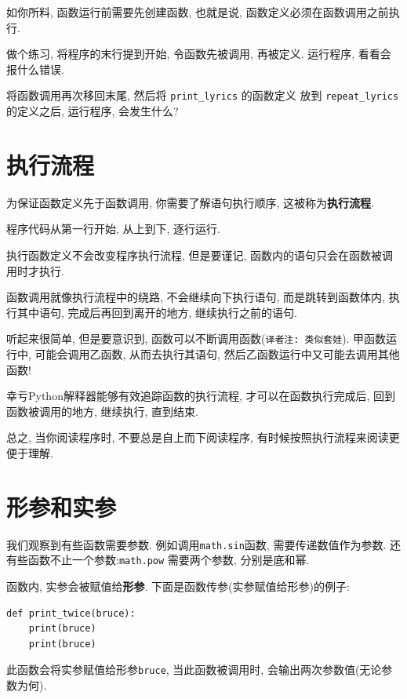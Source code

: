 \documentclass[10pt]{book}
\begin{document}
如你所料, 函数运行前需要先创建函数, 也就是说, 
函数定义必须在函数调用之前执行. 

做个练习, 将程序的末行提到开始, 令函数先被调用, 再被定义. 
运行程序, 看看会报什么错误. 

将函数调用再次移回末尾, 然后将 \verb"print_lyrics" 的函数定义
放到 \verb"repeat_lyrics" 的定义之后, 运行程序, 会发生什么?

\section{执行流程}

为保证函数定义先于函数调用, 你需要了解语句执行顺序, 
这被称为{\bf 执行流程}. 

程序代码从第一行开始, 从上到下, 逐行运行. 

执行函数定义不会改变程序执行流程, 
但是要谨记, 函数内的语句只会在函数被调用时才执行. 

函数调用就像执行流程中的绕路, 不会继续向下执行语句, 
而是跳转到函数体内, 执行其中语句, 完成后再回到离开的地方, 
继续执行之前的语句. 

听起来很简单, 但是要意识到, 函数可以不断调用函数({\tt 译者注: 类似套娃}).
甲函数运行中, 可能会调用乙函数, 从而去执行其语句, 
然后乙函数运行中又可能去调用其他函数!

幸亏Python解释器能够有效追踪函数的执行流程, 才可以在函数执行完成后, 
回到函数被调用的地方, 继续执行, 直到结束. 

总之, 当你阅读程序时, 不要总是自上而下阅读程序, 
有时候按照执行流程来阅读更便于理解. 


\section{形参和实参}
\label{parameters}

我们观察到有些函数需要参数. 例如调用{\tt math.sin}函数, 需要传递数值作为参数. 
还有些函数不止一个参数:{\tt math.pow} 需要两个参数, 分别是底和幂. 

函数内, 实参会被赋值给{\bf 形参}. 
下面是函数传参(实参赋值给形参)的例子:

\begin{verbatim}
def print_twice(bruce):
    print(bruce)
    print(bruce)
\end{verbatim}
%
此函数会将实参赋值给形参{\tt bruce}, 当此函数被调用时, 
会输出两次参数值(无论参数为何). 
\end{document}
